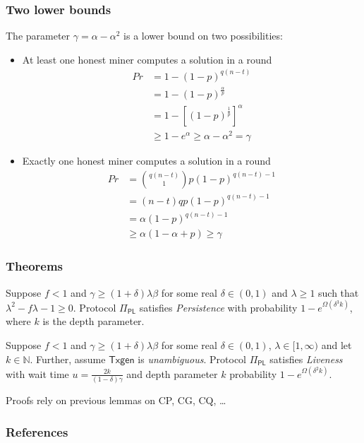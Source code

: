 \documentclass{beamer}
\begin{document}
\begin{frame}
\frametitle{Two lower bounds}

The parameter $\gamma = \alpha - \alpha^2$ is a lower bound on two possibilities:
\begin{itemize}
    \item At least one honest miner computes a solution in a round
    \begin{align}
        Pr &= 1 - (1-p)^{q(n-t)}\\
           &= 1 - (1-p)^{\frac{\alpha}{p}}\\
           &= 1 - [(1-p)^{\frac{1}{p}}]^\alpha\\
           &\geq 1 - e^\alpha \geq \alpha - \alpha^2 = \gamma
    \end{align}
    \item Exactly one honest miner computes a solution in a round
    \begin{align}
        Pr &= {q(n-t) \choose 1} p(1-p)^{q(n-t)-1}\\
           &= (n-t)qp(1-p)^{q(n-t)-1}\\
           &= \alpha (1-p)^{q(n-t)-1}\\
           &\geq \alpha (1-\alpha+p) \geq \gamma
    \end{align}
\end{itemize}

\end{frame}



\begin{frame}
\frametitle{Theorems}

\begin{theorem}[Persistence]
    Suppose $f < 1$ and $\gamma \geq (1 + \delta)\lambda \beta$ for some real $\delta \in (0,1)$ and $\lambda \geq 1$ such that $\lambda^2 - f\lambda - 1 \geq 0$.
    Protocol $\Pi_{\mathsf{PL}}$ satisfies \emph{Persistence} with probability $1 - e^{\Omega(\delta^3k)}$, where $k$ is the depth parameter.
\end{theorem}

\begin{theorem}[Liveness]
    Suppose $f < 1$ and $\gamma \geq (1 + \delta)\lambda \beta$ for some real $\delta \in (0,1)$, $\lambda \in [1, \infty)$ and let $k \in \mathbb{N}$.
    Further, assume $\mathsf{Txgen}$ is \emph{unambiguous}.
    Protocol $\Pi_{\mathsf{PL}}$ satisfies \emph{Liveness} with wait time $u = \frac{2k}{(1-\delta)\gamma}$ and depth parameter $k$ probability $1 - e^{\Omega(\delta^2k)}$.
\end{theorem}

Proofs rely on previous lemmas on CP, CG, CQ, \dots

\end{frame}


\begin{frame}[allowframebreaks]
    \frametitle{References}
    
    \tiny
\end{frame}
\end{document}
